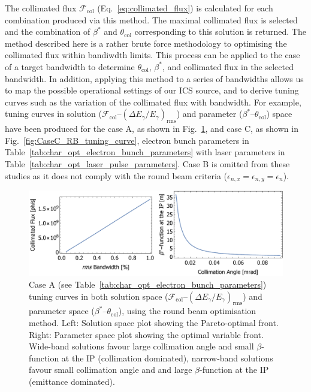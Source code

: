\documentclass[../main.tex]{subfiles}
\begin{document}
The collimated flux $\mathcal{F}_{\mathrm{col}}$ (Eq.~\ref{eq:collimated_flux}) is calculated for each combination produced via this method. The maximal collimated flux is selected and the combination of $\beta^{*}$ and $\theta_{\mathrm{col}}$ corresponding to this solution is returned. The method described here is a rather brute force methodology to optimising the collimated flux within bandiwdth limits. This process can be applied to the case of a target bandwidth to determine $\theta_{\mathrm{col}}$, $\beta^{*}$, and collimated flux in the selected bandwidth. In addition, applying this method to a series of bandwidths allows us to map the possible operational settings of our ICS source, and to derive tuning curves such as the variation of the collimated flux with bandwidth. For example, tuning curves in solution ($\mathcal{F}_{\mathrm{col}}$--$\left(\Delta E_{\gamma}/E_{\gamma}\right)_{\mathrm{rms}}$) and parameter ($\beta^{*}$--$\theta_{\mathrm{col}}$) space have been produced for the case A, as shown in Fig.~\ref{fig:CaseA_RB_tuning_curve}, and case C, as shown in Fig.~\ref{fig:CaseC_RB_tuning_curve}, electron bunch parameters in Table~\ref{tab:char_opt_electron_bunch_parameters} with laser parameters in Table~\ref{tab:char_opt_laser_pulse_parameters}. Case B is omitted from these studies as it does not comply with the round beam criteria ($\epsilon_{n,x}=\epsilon_{n,y}=\epsilon_{n}$).
\begin{figure}[!h]
\centering
\includegraphics[width=\textwidth]{Figures/Optimisation_and_Characterisation_of_Inverse_Compton_Scattering_Sources/Case_A_RB_Tuning_Curves.pdf}
\caption{Case A (see Table~\ref{tab:char_opt_electron_bunch_parameters}) tuning curves in both solution space ($\mathcal{F}_{\mathrm{col}}$--$\left(\Delta E_{\gamma}/E_{\gamma}\right)_{\mathrm{rms}}$) and parameter space ($\beta^{*}$--$\theta_{\mathrm{col}}$), using the round beam optimisation method. Left: Solution space plot showing the Pareto-optimal front. Right: Parameter space plot showing the optimal variable front. Wide-band solutions favour large collimation angle and small $\beta$-function at the IP (collimation dominated), narrow-band solutions favour small collimation angle and and large $\beta$-function at the IP (emittance dominated).}
\label{fig:CaseA_RB_tuning_curve}
\end{figure}
\end{document}
